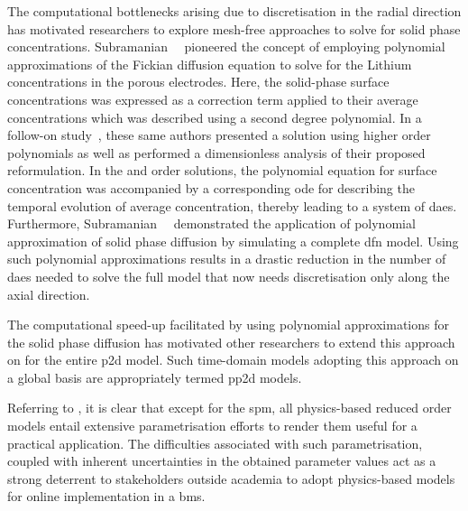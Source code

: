 The  computational  bottlenecks arising  due  to  discretisation in  the  radial
direction has motivated researchers to explore mesh-free approaches to solve for
solid  phase concentrations.  Subramanian~\etal~\cite{Subramanian2004} pioneered
the  concept of  employing polynomial  approximations of  the Fickian  diffusion
equation to solve for the Lithium concentrations in the porous electrodes. Here,
the  solid-phase  surface concentrations  was  expressed  as a  correction  term
applied  to their  average concentrations  which  was described  using a  second
degree  polynomial.  In  a follow-on  study~\cite{Subramanian2005},  these  same
authors  presented  a  solution  using  higher  order  polynomials  as  well  as
performed  a dimensionless  analysis  of their  proposed  reformulation. In  the
 and   order solutions, the  polynomial equation
for  surface concentration  was  accompanied by  a  corresponding \gls{ode}  for
describing the temporal evolution of average concentration, thereby leading to a
system  of  \gls{dae}s. Furthermore,  Subramanian~\etal{}~\cite{Subramanian2007}
demonstrated  the  application  of   polynomial  approximation  of  solid  phase
diffusion  by  simulating a  complete  \gls{dfn}  model. Using  such  polynomial
approximations results in a drastic reduction in the number of \gls{dae}s needed
to  solve the  full model  that now  needs discretisation  only along  the axial
direction.


The computational  speed-up facilitated  by using polynomial  approximations for
the  solid  phase diffusion  has  motivated  other  researchers to  extend  this
approach on  for the  entire \gls{p2d} model.  Such time-domain  models adopting
this approach on a global basis are appropriately termed \gls{pp2d} models.


Referring  to  ,  it  is  clear that  except  for
the  \gls{spm},   all  physics-based  reduced  order   models  entail  extensive
parametrisation efforts   to render  them useful for a  practical application.
The  difficulties associated  with such  parametrisation, coupled  with inherent
uncertainties  in  the obtained  parameter  values  act  as a  strong  deterrent
to  stakeholders  outside academia  to  adopt  physics-based models  for  online
implementation in a \gls{bms}.


